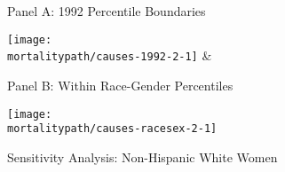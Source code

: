 \documentclass[12pt,letterpaper]{article}
\begin{document}
\begin{figure}[H]
  \caption{Sensitivity Analysis: Non-Hispanic White Women}
  \begin{center}
    \vspace{-.6cm}
    Panel A: 1992 Percentile Boundaries
  \end{center}
  \vspace{-1.4cm}
  \begin{center}
    \texttt{[image: \\mortalitypath/causes-1992-2-1]} &
  \end{center}

  \begin{center}
    \vspace{-.6cm}
    Panel B: Within Race-Gender Percentiles
  \end{center}
  \vspace{-1.4cm}
  \begin{center}
    \texttt{[image: \\mortalitypath/causes-racesex-2-1]} \\
  \end{center}
\end{figure}
\end{document}
